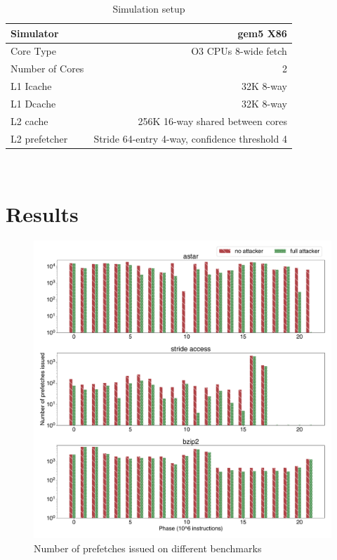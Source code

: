 \documentclass[conference]{IEEEtran}
\begin{document}
\begin{table}[hbp]
\centering
\begin{tabular}{|l|r|}
    \hline
    Simulator  & gem5 X86\\
    \hline
    Core Type  & O3 CPUs 8-wide fetch\\
    \hline
    Number of Cores & 2\\
    \hline
    L1 Icache & 32K 8-way\\
    \hline
    L1 Dcache & 32K 8-way\\
    \hline
    L2 cache & 256K 16-way shared between cores\\
    \hline
    L2 prefetcher  & Stride 64-entry 4-way, confidence threshold 4\\
    \hline
\end{tabular}
\\
\caption{Simulation setup}
\label{tab:simulation_setup}
\end{table}

\section{Results} \label{sec:results}

\begin{figure}[htbp]
    \centering
    \includegraphics[width=\columnwidth]{hwpf_num}
    \caption{Number of prefetches issued on different benchmarks}
    \label{fig:prefetch_attack}
\end{figure}
\end{document}
